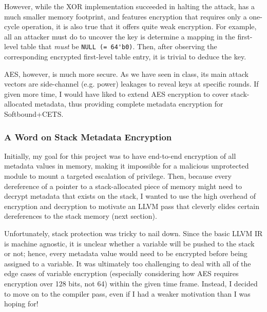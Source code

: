 \documentclass{article}
\begin{document}
            \bigbreak{}
            
            However, while the XOR implementation succeeded in halting the attack,
            has a much smaller memory footprint, and features encryption that 
            requires only a one-cycle operation, it is
            also true that it offers quite weak encryption. For example, all an attacker
            must do to uncover the key is determine a mapping in the first-level
            table that \textit{must} be \verb|NULL (= 64'b0)|. Then, after observing the 
            corresponding encrypted first-level table entry, it is trivial to 
            deduce the key.

            \bigbreak{}

            AES, however, is much more secure. As we have seen in class, its
            main attack vectors are side-channel (e.g. power) leakages to reveal
            keys at specific rounds. If given more time, I would have liked to
            extend AES encryption to cover stack-allocated metadata, thus
            providing complete metadata encryption for Softbound+CETS.

        \subsubsection{A Word on Stack Metadata Encryption}

            Initially, my goal for this project was to have end-to-end encryption
            of all metadata values in memory, making it impossible for a 
            malicious unprotected module to mount a targeted escalation of 
            privilege. Then, because every dereference of a pointer to a 
            stack-allocated 
            piece of memory might need to decrypt metadata that
            exists on the stack, I wanted to use the high overhead of encryption
            and decryption to motivate an LLVM pass that cleverly
            elides certain dereferences to the stack memory (next section).

            \bigbreak{}

            Unfortunately, stack protection was tricky to nail down. Since the basic
            LLVM IR is machine agnostic, it is unclear whether a variable will be pushed 
            to the stack or not; hence, every metadata value would need to be encrypted 
            before being assigned to a variable. It was ultimately too challenging
            to deal with all of the edge cases of variable encryption (especially
            considering how AES requires encryption over 128 bits, not 64) within
            the given time frame. Instead, I decided to move on to the compiler pass, even
            if I had a weaker motivation than I was hoping for!
\end{document}
